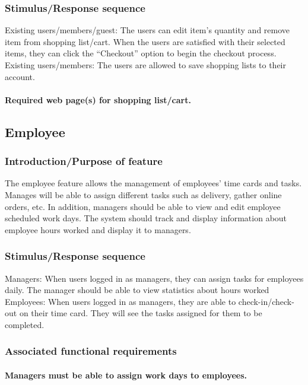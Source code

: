 \documentclass{scrreprt}
\begin{document}
\subsubsection{Stimulus/Response sequence}
Existing users/members/guest:
The users can edit item’s quantity and remove item from shopping list/cart. When the users are satisfied with their selected items, they can click the “Checkout” option to begin the checkout process. 
Existing users/members:
The users are allowed to save shopping lists to their account.

\paragraph[]{\normalfont Required web page(s) for shopping list/cart.}


\subsection{Employee}
\subsubsection{Introduction/Purpose of feature}
The employee feature allows the management of employees’ time cards and tasks. Manages will be able to assign different tasks such as delivery, gather online orders, etc.  In addition, managers should be able to view and edit employee scheduled work days.  The system should track and display information about employee hours worked and display it to managers.


\subsubsection{Stimulus/Response sequence}
Managers:
When users logged in as managers, they can assign tasks for employees daily.  The manager should be able to view statistics about hours worked
Employees:
When users logged in as managers, they are able to check-in/check-out on their time card. They will see the tasks assigned for them to be completed.

\subsubsection{Associated functional requirements}
\paragraph[]{\normalfont Managers must be able to assign work days to employees.}
\end{document}

